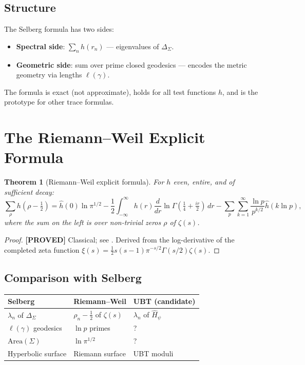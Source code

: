 \documentclass[11pt,a4paper]{article}
\newtheorem{theorem}{Theorem}
\newcommand{\proved}[1]{\textbf{[PROVED]} #1}
\begin{document}
\subsection{Structure}

The Selberg formula has two sides:
\begin{itemize}
  \item \textbf{Spectral side}: $\sum_n h(r_n)$ — eigenvalues of $\Delta_\Sigma$.
  \item \textbf{Geometric side}: sum over prime closed geodesics — encodes the
    metric geometry via lengths $\ell(\gamma)$.
\end{itemize}

The formula is exact (not approximate), holds for all test functions $h$,
and is the prototype for other trace formulas.

\section{The Riemann--Weil Explicit Formula}

\begin{theorem}[Riemann--Weil explicit formula]
  \label{thm:RW}
  For $h$ even, entire, and of sufficient decay:
  \[
    \sum_\rho h(\rho - \tfrac12)
    = \hat{h}(0)\ln\pi^{1/2}
    - \frac12 \int_{-\infty}^\infty h(r)\frac{d}{dr}\ln\Gamma(\tfrac14+\tfrac{ir}{2})\,dr
    - \sum_p \sum_{k=1}^\infty \frac{\ln p}{p^{k/2}}\hat{h}(k\ln p),
  \]
  where the sum on the left is over non-trivial zeros $\rho$ of $\zeta(s)$.
\end{theorem}

\begin{proof}
  \proved{} Classical; see \cite[Ch.\ 5]{Davenport}.  Derived from the
  log-derivative of the completed zeta function $\xi(s) = \frac12 s(s-1)\pi^{-s/2}\Gamma(s/2)\zeta(s)$.
\end{proof}

\subsection{Comparison with Selberg}

\begin{center}
\begin{tabular}{lll}
\hline
Selberg & Riemann--Weil & UBT (candidate) \\
\hline
$\lambda_n$ of $\Delta_\Sigma$ & $\rho_n - \frac12$ of $\zeta(s)$ & $\lambda_n$ of $\hat{H}_\psi$ \\
$\ell(\gamma)$ geodesics & $\ln p$ primes & ? \\
$\mathrm{Area}(\Sigma)$ & $\ln\pi^{1/2}$ & ? \\
Hyperbolic surface & Riemann surface & UBT moduli \\
\hline
\end{tabular}
\end{center}
\end{document}
